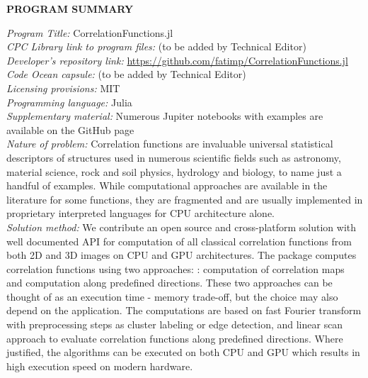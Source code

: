 \documentclass[1p]{elsarticle}
\begin{document}
{\bf PROGRAM SUMMARY} \\
\begin{small}
\noindent
{\em Program Title:} CorrelationFunctions.jl \\
{\em CPC Library link to program files:} (to be added by Technical Editor) \\
{\em Developer's repository link:}
\url{https://github.com/fatimp/CorrelationFunctions.jl} \\
{\em Code Ocean capsule:} (to be added by Technical Editor)\\
{\em Licensing provisions:} MIT \\
{\em Programming language:} Julia \\
{\em Supplementary material:} Numerous Jupiter notebooks with examples are available on the GitHub page\\
{\em Nature of problem:} Correlation functions are invaluable universal
statistical descriptors of structures used in numerous scientific
fields such as astronomy, material science, rock and soil physics, hydrology and biology, to name just a handful of examples. While computational approaches
are available in the literature for some functions, they are fragmented and are usually implemented in proprietary
interpreted languages for CPU architecture alone. \\
{\em Solution method:} We contribute an open
source and cross-platform solution with well documented API for computation of all classical
correlation functions from both 2D and 3D images on CPU and GPU architectures. The package computes correlation functions using two approaches: : computation of
correlation maps and computation along predefined directions. These two
approaches can be thought of as an execution time - memory trade-off, but the choice may also depend on the application.
The computations are based on fast Fourier transform with preprocessing steps as cluster labeling or edge
detection, and linear scan approach to evaluate correlation functions along predefined directions. Where justified, the algorithms can be executed on both
CPU and GPU which results in high execution speed on modern hardware. \\
\end{small}
\end{document}
